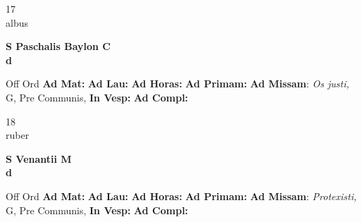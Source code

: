 \documentclass[10pt, openany]{book}
\begin{document}
    \begin{center}
        \begin{minipage}{3.5in}
            \vspace{2em}
            \begin{minipage}{0.5in}
                {\Huge 17} \\
                {\normalsize albus}
            \end{minipage}
            \begin{minipage}{3.0in}
                \textbf{ \large S Paschalis Baylon C \\
                \textnormal{\normalsize d}}

            \end{minipage}
            \begin{justify}Off Ord
                \textbf{Ad Mat: }
                \textbf{Ad Lau: }
                \textbf{Ad Horas: }
                \textbf{Ad Primam: }\textbf{Ad Missam}: \textit{Os justi,} G, Pre Communis, 
                \textbf{In Vesp: }
                \textbf{Ad Compl: }
            \end{justify}
        \end{minipage}
    \end{center}

    \begin{center}
        \begin{minipage}{3.5in}
            \vspace{2em}
            \begin{minipage}{0.5in}
                {\Huge 18} \\
                {\normalsize ruber}
            \end{minipage}
            \begin{minipage}{3.0in}
                \textbf{ \large S Venantii M \\
                \textnormal{\normalsize d}}

            \end{minipage}
            \begin{justify}Off Ord
                \textbf{Ad Mat: }
                \textbf{Ad Lau: }
                \textbf{Ad Horas: }
                \textbf{Ad Primam: }\textbf{Ad Missam}: \textit{Protexisti,} G, Pre Communis, 
                \textbf{In Vesp: }
                \textbf{Ad Compl: }
            \end{justify}
        \end{minipage}
    \end{center}
\end{document}
